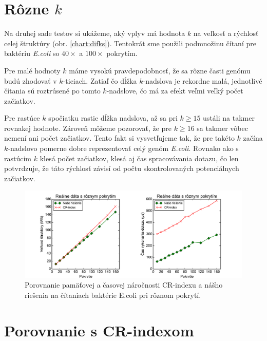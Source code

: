 \section{Rôzne $k$}

Na druhej sade testov si ukážeme, aký vplyv má hodnota $k$ na veľkosť a rýchlosť celej štruktúry (obr. \ref{chart:difks}).
Tentokrát sme použili podmnožinu čítaní pre baktériu \emph{E.coli} so $40\times$ a $100\times$ pokrytím.

Pre malé hodnoty $k$ máme vysokú pravdepodobnosť, že sa rôzne časti genómu budú zhodovať v $k$-ticiach.
Zatiaľ čo dĺžka $k$-nadslova je rekordne malá, jednotlivé
čítania sú roztrúsené po tomto $k$-nadslove, čo má za efekt veľmi veľký počet začiatkov.

Pre rastúce
$k$ spočiatku rastie dĺžka nadslova, až sa pri $k \ge 15$ ustáli na takmer rovnakej hodnote. Zároveň
môžeme pozorovať, že pre $k \ge 16$ sa takmer vôbec nemení ani počet začiatkov. Tento fakt si
vysvetľujeme tak, že pre takéto $k$ začína $k$-nadslovo pomerne dobre reprezentovať celý genóm
\emph{E.coli}. Rovnako ako s rastúcim $k$ klesá počet začiatkov, klesá aj čas spracovávania dotazu, čo len
potvrdzuje, že táto rýchlosť závisí od počtu skontrolovaných potenciálnych začiatkov.

\begin{figure}

\centerline{\includegraphics[width=1\textwidth]{images/chart_srcr.pdf}}

\caption[Porovnanie CR-indexu a našej štruktúry]{Porovnanie pamäťovej a časovej náročnosti
CR-indexu a nášho riešenia na čítaniach baktérie E.coli pri rôznom pokrytí.}

\label{chart:srcr}

\end{figure}

\section{Porovnanie s CR-indexom}

